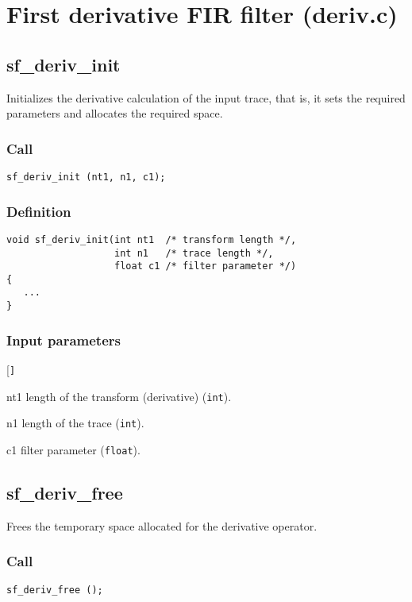 \section{First derivative FIR filter (deriv.c)}




\subsection{{sf\_deriv\_init}}
Initializes the derivative calculation of the input trace, that is, it sets the required parameters and allocates the required space.


\subsubsection*{Call}
\begin{verbatim}sf_deriv_init (nt1, n1, c1);\end{verbatim}


\subsubsection*{Definition}
\begin{verbatim}
void sf_deriv_init(int nt1  /* transform length */, 
                   int n1   /* trace length */, 
                   float c1 /* filter parameter */)
{
   ...
}

\end{verbatim}
\subsubsection*{Input parameters}
\begin{desclist}{\tt }{\quad}[\tt ]
   \setlength\itemsep{0pt}
   \item[nt1] length of the transform (derivative) (\texttt{int}). 
   \item[n1]  length of the trace (\texttt{int}). 
   \item[c1]  filter parameter (\texttt{float}).  
\end{desclist}




\subsection{{sf\_deriv\_free}}
Frees the temporary space allocated for the derivative operator.


\subsubsection*{Call}
\begin{verbatim}sf_deriv_free ();\end{verbatim}


